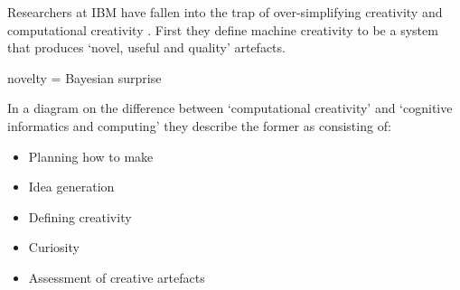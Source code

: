 \spirals

Researchers at IBM have fallen into the trap of over-simplifying creativity and computational creativity \autocite{Varshney2013}. First they define machine creativity to be a system that produces `novel, useful and quality' artefacts.


novelty = Bayesian surprise \autocite{Baldi2010}


In a diagram on the difference between `computational creativity' and `cognitive informatics and computing' they describe the former as consisting of:

\begin{itemize}
  \item Planning how to make
  \item Idea generation
  \item Defining creativity
  \item Curiosity
  \item Assessment of creative artefacts
\end{itemize}



